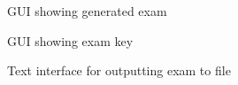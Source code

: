 \documentclass[12pt]{article}
\newcommand\nocaption[1]{\newline\footnotesize\sffamily #1}
\begin{document}
\begin{figure}[ht]
\centering
    \nocaption{GUI showing generated exam}
    \label{fig:exam-1}
\end{figure}
\begin{figure}
\centering
    \nocaption{GUI showing exam key}
    \label{fig:exam-2}
\end{figure}
\begin{figure}
\centering
    \nocaption{Text interface for outputting exam to file}
    \label{fig:exam-3}
\end{figure}


\clearpage
\end{document}
